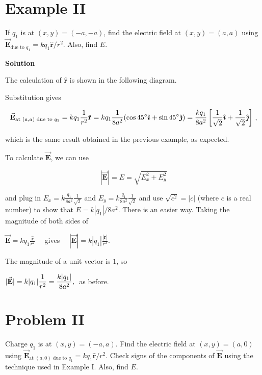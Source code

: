 \documentclass{article}
\newcommand{\ds}[0]{\displaystyle}
\newcommand{\ihat}[0]{\hat{\boldsymbol{\imath}}}
\newcommand{\jhat}[0]{\hat{\boldsymbol{\jmath}}}
\newcommand{\rhat}[0]{\hat{\mathbf{r}}}
\newcommand{\bfvec}[1]{\vec{\mathbf{#1}}}
\begin{document}
\section{Example II}

If $q_1$ is at $(x,y)=(-a,-a)$, find the electric field at $(x,y)=(a,a)$ using $\bfvec{E}_{\text{due to }q_1}=kq_1{\rhat}/{r^2}$. Also, find $E$.

\textbf{Solution}

The calculation of $\rhat$ is shown in the following diagram.



Substitution gives

\begin{equation}
\bfvec{E}_{\text{at }(a,a)\text{ due to }q_1}=kq_1\frac{1}{r^2}\rhat = kq_1\frac{1}{8a^2}(\cos 45^\circ \ihat + \sin 45^\circ \jhat) =\frac{kq_1}{8a^2}\left[\frac{1}{\sqrt{2}}\ihat + \frac{1}{\sqrt{2}}\jhat\right]\thinspace,
\end{equation}

which is the same result obtained in the previous example, as expected.

To calculate $\bfvec{E}$, we can use

\begin{equation}
|\bfvec{E}|=E=\sqrt{E_x^2+E_y^2}
\end{equation}

and plug in $E_x=k\frac{q_1}{8a^2}\frac{1}{\sqrt{2}}$ and $E_y=k\frac{q_1}{8a^2}\frac{1}{\sqrt{2}}$ and use $\sqrt{c^2}=|c|$ (where $c$ is a real number) to show that $E=k|q_1|/{8a^2}$. There is an easier way. Taking the magnitude of both sides of

$\ds\bfvec{E}=kq_1\frac{\rhat}{r^2}\quad$
gives
$\quad\ds|\bfvec{E}|=k|q_1|\frac{|\rhat|}{r^2}$.

The magnitude of a unit vector is $1$, so

$\ds|\bfvec{E}|=k|q_1|\frac{1}{r^2}=\frac{k|q_1|}{8a^2},\thickspace$ as before.

\section{Problem II}

Charge $q_1$ is at $(x,y)=(-a,a)$. Find the electric field at $(x,y)=(a, 0)$ using $\bfvec{E}_{\text{at }(a,0)\text{ due to }q_1}=kq_1{\rhat}/{r^2}$. Check signs of the components of $\bfvec{E}$ using the technique used in Example I. Also, find $E$.
\end{document}
